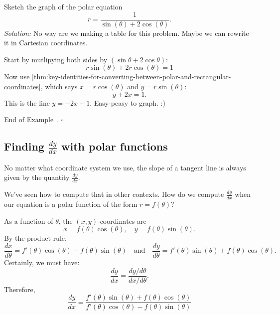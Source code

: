 \documentclass[10pt]{article}
\theoremstyle{definition}
\newtheorem{example}[theorem]{Example}
\renewenvironment{example}
{\begin{oldexample}}
  {\par\smallskip\hfill   End of Example~\theexample. $\square$    \par\end{oldexample}}
\newcommand{\1}[1]{\textbf{1}_{\left[#1\right]}} %
\begin{document}
\begin{example}
  Sketch the graph of the polar equation
  \begin{equation*}
    r = \frac{1}{\sin(\theta)+2\cos(\theta)}.
  \end{equation*}
  \textit{Solution:} No way are we making a table for this problem. Maybe we can rewrite it in Cartesian
  coordinates.

  Start by mutlipying both sides by $(\sin\theta + 2\cos \theta)$:
  \begin{equation*}
    r\sin(\theta)+2r\cos(\theta) = 1
  \end{equation*}
  Now use \cref{thm:key-identities-for-converting-between-polar-and-rectangular-coordinates}, which says
  $x=r\cos(\theta)$ and $y=r\sin(\theta)$:
  \begin{equation*}
    y +2x = 1.
  \end{equation*}
  This is the line $y=-2x+1$. Easy-peasy to graph. :)
\end{example}


\subsection{Finding $\frac{dy}{dx}$ with polar functions}
No matter what coordinate system we use, the slope of a tangent line is always given by the quantity $\frac{dy}{dx}$.

We've seen how to compute that in other contexts. How do we compute $\frac{dy}{dx}$ when our equation is
a polar function of the form $r = f(\theta)$?

As a function of $\theta$, the $(x,y)$-coordinates are
\begin{equation*}
  x=f(\theta)\cos(\theta), \quad y = f(\theta)\sin(\theta).
\end{equation*}
By the product rule,
\begin{equation*}
  \frac{dx}{d\theta} = f'(\theta)\cos(\theta)-f(\theta)\sin(\theta) \quad \text{and} \quad  \frac{dy}{d\theta} = f'(\theta)\sin(\theta) + f(\theta)\cos(\theta).
\end{equation*}
Certainly, we must have:
\begin{equation*}
  \frac{dy}{dx} = \frac{dy/d\theta}{dx/d\theta}.
\end{equation*}
Therefore,
\begin{equation*}
  \boxed{
    \frac{dy}{dx} = \frac{f'(\theta)\sin(\theta) + f(\theta)\cos(\theta)}{f'(\theta)\cos(\theta)-f(\theta)\sin(\theta)}
  }
\end{equation*}
\end{document}
